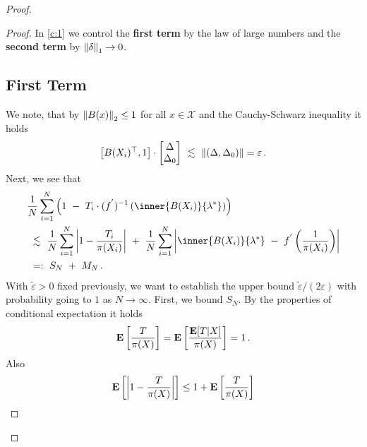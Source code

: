 \begin{proof}
\begin{proof}
In \eqref{c:1} we control the \textbf{first term} by the law of large numbers 
and the \textbf{second term} by $\left\lVert\delta\right\rVert_1\to 0$.
\subsection*{First Term}
We note, that by $\left\lVert B(x)\right\rVert_2\le 1$ for all $x\in\mathcal{X}$ and the Cauchy-Schwarz inequality
it holds
\begin{gather}
  \label{c:first:0}
      \left[ 
       B(X_i)^\top,
       1
     \right]
     \cdot
     \begin{bmatrix}
       \Delta\\
       \Delta_0
     \end{bmatrix}
     \ 
     \lesssim
     \ 
     \norm{(\Delta,\Delta_0)}
     =\varepsilon
     \,.
\end{gather}
Next, we see that
\begin{align}
  \label{c:first:1}
  \begin{split}
  &
     \frac{1}{N}
     \sum_{i=1}^{N} 
     \left( 
       1
       \ 
       -
       \ 
     T_i
     \cdot
     (f^{'})^{-1}
     \left( 
       \inner
       {B(X_i)}
       {\lambda^*}
     \right)
     \right)
     \\
     &
     \ 
     \lesssim
     \ 
     \frac{1}{N}
     \sum_{i=1}^{N} 
     \left|
     1
     -
     \frac{T_i}{\pi(X_i)}
     \right|
      \ 
     +
      \ 
     \frac{1}{N}
     \sum_{i=1}^{N} 
     \left| 
        \inner
       {B(X_i)}
       {\lambda^*}
      \ 
        -
        \ 
        f^{'}
        \left( 
          \frac{1}{\pi(X_i)}
        \right)
     \right|
     \\
     &
     \ 
     =:
     \ 
     S_N
     \
     +
     \ 
     M_N
     \,.
\end{split}
\end{align}
With $
\tilde{\varepsilon}
>0
$
fixed previously,
we want to
establish the upper bound
$
\tilde{\varepsilon}
/
(2\varepsilon)
$
with probability going to $1$ as $N\to\infty$.
First, we bound $S_N$.
By the properties of conditional expectation it holds
\begin{gather*}
  \mathbf{E}
  \left[ 
    \frac{T}{\pi(X)}
  \right]
  =
  \mathbf{E}
  \left[ 
    \frac{\mathbf{E}[T|X]}{\pi(X)}
  \right]
  =1
  \,.
\end{gather*}
Also
\begin{gather}
  \E
  \left[ 
    \left| 
    1
    -
    \frac{T}{\pi(X)}
    \right|
  \right]
  \le
  1
  +
  \E
  \left[ 
    \frac{T}{\pi(X)}
  \right]

\end{gather}
\end{proof}
\end{proof}
